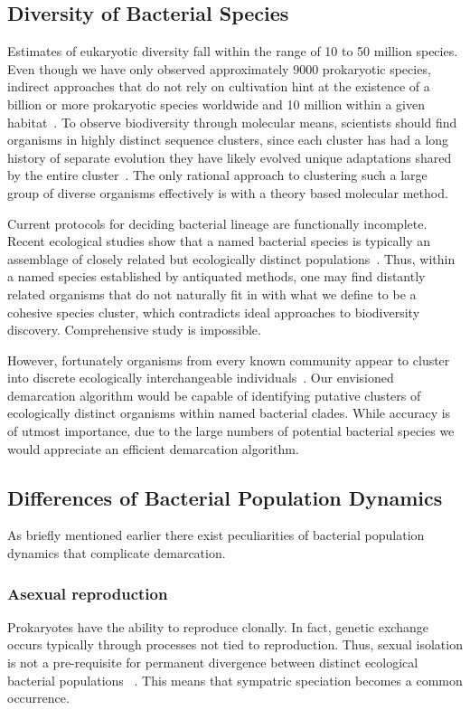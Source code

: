 \subsection{Diversity of Bacterial Species}
Estimates of eukaryotic diversity fall within the range of 10 to 50 million species. Even though we have only observed approximately 9000 prokaryotic species, indirect approaches that do not rely on cultivation hint at the existence of a billion or more prokaryotic species worldwide and 10 million within a given habitat~\cite{cohan2008origins}.
To observe biodiversity through molecular means, scientists should find organisms in highly distinct sequence clusters, since each cluster has had a long history of separate evolution they have likely evolved unique adaptations shared by the entire cluster~\cite{cohan2007systematics}.
The only rational approach to clustering such a large group of diverse organisms effectively is with a theory based molecular method.

Current protocols for deciding bacterial lineage are functionally incomplete. Recent ecological studies show that a named bacterial species is typically an assemblage of closely related but ecologically distinct populations~\cite{cohan2007systematics}.
Thus, within a named species established by antiquated methods, one may find distantly related organisms that do not naturally fit in with what we define to be a cohesive species cluster, which contradicts ideal approaches to biodiversity discovery.
Comprehensive study is impossible.

However, fortunately organisms from every known community appear to cluster into discrete ecologically interchangeable individuals~\cite{cohan2007systematics}.
Our envisioned demarcation algorithm would be capable of identifying putative clusters of ecologically distinct organisms within named bacterial clades.
While accuracy is of utmost importance, due to the large numbers of potential bacterial species we would appreciate an efficient demarcation algorithm.


\subsection{Differences of Bacterial Population Dynamics}
As briefly mentioned earlier there exist peculiarities of bacterial population dynamics that complicate demarcation.


\subsubsection*{Asexual reproduction}
Prokaryotes have the ability to reproduce clonally.
In fact, genetic exchange occurs typically through processes not tied to reproduction.
Thus, sexual isolation is not a pre-requisite for permanent divergence between distinct ecological bacterial populations ~\cite{cohan2007systematics}.
This means that sympatric speciation becomes a common occurrence.

